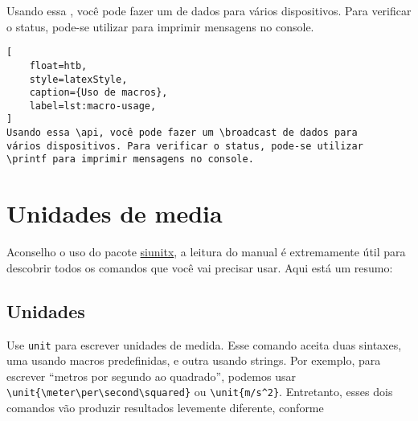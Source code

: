Usando essa \api, você pode fazer um \broadcast de dados para vários dispositivos. Para verificar o status, pode-se utilizar \printf para imprimir mensagens no console.

\begin{lstlisting}[
    float=htb, 
    style=latexStyle, 
    caption={Uso de macros},
    label=lst:macro-usage,
]
Usando essa \api, você pode fazer um \broadcast de dados para 
vários dispositivos. Para verificar o status, pode-se utilizar 
\printf para imprimir mensagens no console.
\end{lstlisting}

\section{Unidades de media}

Aconselho o uso do pacote \href{https://ctan.org/pkg/siunitx}{siunitx}, a leitura do manual é extremamente útil para descobrir todos os comandos que você vai precisar usar. Aqui está um resumo:

\subsection{Unidades}

Use \texttt{unit} para escrever unidades de medida. Esse comando aceita duas sintaxes, uma usando macros predefinidas, e outra usando strings. Por exemplo, para escrever \enquote{metros por segundo ao quadrado}, podemos usar \verb|\unit{\meter\per\second\squared}| ou \verb|\unit{m/s^2}|. Entretanto, esses dois comandos vão produzir resultados levemente diferente, conforme

\begin{table}[htb] 
	\begin{center} 
	\end{center} 
\end{table} 

